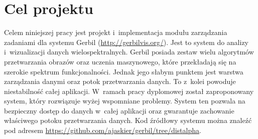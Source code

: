 
\chapter{Cel projektu}

Celem niniejszej pracy jest projekt i~implementacja modułu zarządzania zadaniami dla systemu Gerbil (\url{http://gerbilvis.org/}). Jest to system do analizy i~wizualizacji danych wielospektralnych. Gerbil posiada zestaw wielu algorytmów przetwarzania obrazów oraz uczenia maszynowego, które przekładają się na szerokie spektrum funkcjonalności. Jednak jego słabym punktem jest warstwa zarządzania danymi oraz potok przetwarzania danych. To z~kolei powoduje niestabilność całej aplikacji. W~ramach pracy dyplomowej został zaproponowany system, który rozwiązuje wyżej wspomniane problemy. System ten pozwala na bezpieczny dostęp do danych w~całej aplikacji oraz gwarantuje zachowanie właściwego potoku przetwarzania danych.
Kod źródłowy systemu można znaleźć pod adresem \url{https://github.com/ajaskier/gerbil/tree/distalpha}.
